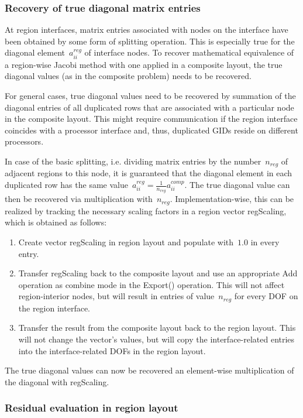 \documentclass[11pt]{article}
\begin{document}
\subsubsection{Recovery of true diagonal matrix entries}
\label{sec:RecoveryTrueDiagonal}

At region interfaces, matrix entries associated with nodes on the interface 
have been obtained by some form of splitting operation. This is especially true for the diagonal element~$a^{reg}_{ii}$ of interface nodes. 
To recover mathematical equivalence of a region-wise Jacobi method with one applied in a composite layout, 
the true diagonal values (as in the composite problem) needs to be recovered.

For general cases, true diagonal values need to be recovered by summation of the diagonal entries of all duplicated rows 
that are associated with a particular node in the composite layout. 
This might require communication if the region interface coincides with a processor interface 
and, thus, duplicated GIDs reside on different processors.

In case of the basic splitting, i.e. dividing matrix entries by the number~$n_{reg}$ of adjacent regions to this node, it is guaranteed
that the diagonal element in each duplicated row has the same value~$a^{reg}_{ii} = \frac{1}{n_{reg}}a^{comp}_{ii}$. 
The true diagonal value can then be recovered via multiplication with~$n_{reg}$. 
Implementation-wise, this can be realized by tracking the necessary scaling factors in a region vector {\sf regScaling},
which is obtained as follows:
\begin{enumerate}
\item Create vector {\sf regScaling} in region layout and populate with~$1.0$ in every entry.
\item Transfer {\sf regScaling} back to the composite layout and use an appropriate {\sf Add} operation as combine mode in the {\sf Export()} operation. 
This will not affect region-interior nodes, but will result in entries of value~$n_{reg}$ for every DOF on the region interface.
\item Transfer the result from the composite layout back to the region layout. This will not change the vector's values, 
but will copy the interface-related entries into the interface-related DOFs in the region layout.
\end{enumerate}
The true diagonal values can now be recovered an element-wise multiplication of the diagonal with {\sf regScaling}.

\subsubsection{Residual evaluation in region layout}
\label{sec:CalcRegionalResidual}
\end{document}
